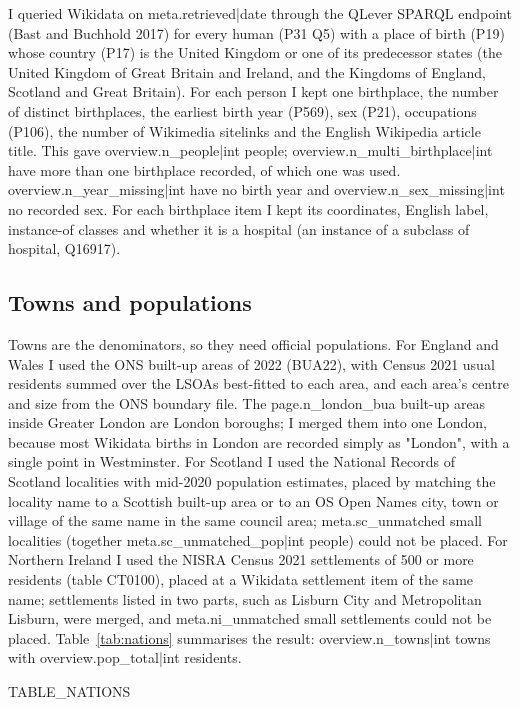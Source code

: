 \documentclass[11pt,a4paper]{article}
\begin{document}
I queried Wikidata on {{meta.retrieved|date}} through the QLever SPARQL endpoint (Bast and Buchhold 2017) for every human (P31 Q5) with a place of birth (P19) whose country (P17) is the United Kingdom or one of its predecessor states (the United Kingdom of Great Britain and Ireland, and the Kingdoms of England, Scotland and Great Britain). For each person I kept one birthplace, the number of distinct birthplaces, the earliest birth year (P569), sex (P21), occupations (P106), the number of Wikimedia sitelinks and the English Wikipedia article title. This gave {{overview.n_people|int}} people; {{overview.n_multi_birthplace|int}} have more than one birthplace recorded, of which one was used. {{overview.n_year_missing|int}} have no birth year and {{overview.n_sex_missing|int}} no recorded sex. For each birthplace item I kept its coordinates, English label, instance-of classes and whether it is a hospital (an instance of a subclass of hospital, Q16917).

\subsection{Towns and populations}

Towns are the denominators, so they need official populations. For England and Wales I used the ONS built-up areas of 2022 (BUA22), with Census 2021 usual residents summed over the LSOAs best-fitted to each area, and each area's centre and size from the ONS boundary file. The {{page.n_london_bua}} built-up areas inside Greater London are London boroughs; I merged them into one London, because most Wikidata births in London are recorded simply as "London", with a single point in Westminster. For Scotland I used the National Records of Scotland localities with mid-2020 population estimates, placed by matching the locality name to a Scottish built-up area or to an OS Open Names city, town or village of the same name in the same council area; {{meta.sc_unmatched}} small localities (together {{meta.sc_unmatched_pop|int}} people) could not be placed. For Northern Ireland I used the NISRA Census 2021 settlements of 500 or more residents (table CT0100), placed at a Wikidata settlement item of the same name; settlements listed in two parts, such as Lisburn City and Metropolitan Lisburn, were merged, and {{meta.ni_unmatched}} small settlements could not be placed. Table~\ref{tab:nations} summarises the result: {{overview.n_towns|int}} towns with {{overview.pop_total|int}} residents.

{{TABLE_NATIONS}}
\end{document}
